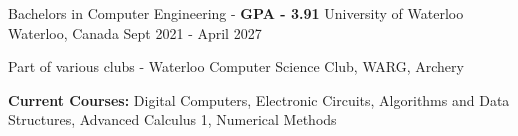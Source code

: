 

\begin{cventries}

  \cventry
    {Bachelors in Computer Engineering - \textbf{GPA - 3.91}} %
    {University of Waterloo} %
    {Waterloo, Canada} %
    {Sept 2021 - April 2027} %
    {
      \begin{cvitems} %
        \item {Part of various clubs - Waterloo Computer Science Club, WARG, Archery}
        \item {\textbf{Current Courses:} Digital Computers, Electronic Circuits, Algorithms and Data Structures, Advanced Calculus 1, Numerical Methods}
      \end{cvitems}
    }
    
\end{cventries}

